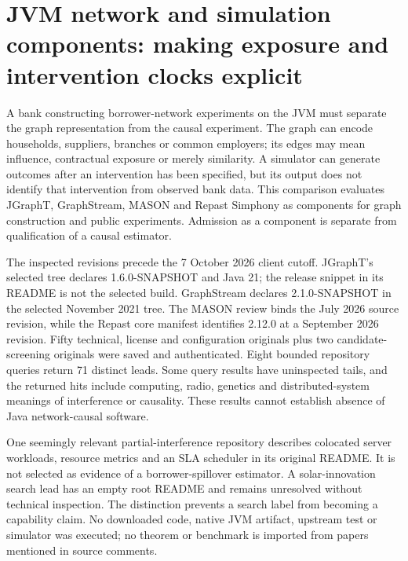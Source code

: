 \section[JVM network contracts]{JVM network and simulation components: making exposure and intervention clocks explicit}
\label{sec:exec25-java-network}

A bank constructing borrower-network experiments on the JVM must separate the graph representation from the causal experiment. The graph can encode households, suppliers, branches or common employers; its edges may mean influence, contractual exposure or merely similarity. A simulator can generate outcomes after an intervention has been specified, but its output does not identify that intervention from observed bank data. This comparison evaluates JGraphT, GraphStream, MASON and Repast Simphony as components for graph construction and public experiments. Admission as a component is separate from qualification of a causal estimator.\citep{exec25_jnet_jgrapht,exec25_jnet_graphstream,exec25_jnet_mason,exec25_jnet_repast}

The inspected revisions precede the 7 October 2026 client cutoff. JGraphT's selected tree declares 1.6.0-SNAPSHOT and Java 21; the release snippet in its README is not the selected build. GraphStream declares 2.1.0-SNAPSHOT in the selected November 2021 tree. The MASON review binds the July 2026 source revision, while the Repast core manifest identifies 2.12.0 at a September 2026 revision. Fifty technical, license and configuration originals plus two candidate-screening originals were saved and authenticated. Eight bounded repository queries return 71 distinct leads. Some query results have uninspected tails, and the returned hits include computing, radio, genetics and distributed-system meanings of interference or causality. These results cannot establish absence of Java network-causal software.\citep{exec25_jnet_choice}

One seemingly relevant partial-interference repository describes colocated server workloads, resource metrics and an SLA scheduler in its original README. It is not selected as evidence of a borrower-spillover estimator. A solar-innovation search lead has an empty root README and remains unresolved without technical inspection. The distinction prevents a search label from becoming a capability claim. No downloaded code, native JVM artifact, upstream test or simulator was executed; no theorem or benchmark is imported from papers mentioned in source comments.\citep{exec25_jnet_choice}

